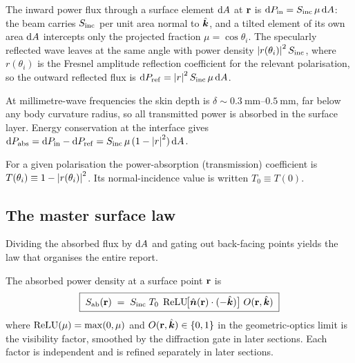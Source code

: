 The inward power flux through a surface element $\mathrm{d} A$ at $\mathbf{r}$ is
$\mathrm{d} P_{\mathrm{in}} = S_{\mathrm{inc}}\,\mu\,\mathrm{d} A$: the beam carries $S_{\mathrm{inc}}$ per unit
area normal to $\hat{\bm{k}}$, and a tilted element of its own area $\mathrm{d} A$
intercepts only the projected fraction $\mu = \cos\theta_i$. The specularly
reflected wave leaves at the same angle with power density
$\abs{r(\theta_i)}^2\,S_{\mathrm{inc}}$, where $r(\theta_i)$ is the Fresnel amplitude
reflection coefficient for the relevant polarisation, so the outward reflected
flux is $\mathrm{d} P_{\mathrm{ref}} = \abs{r}^2\,S_{\mathrm{inc}}\,\mu\,\mathrm{d} A$.

At millimetre-wave frequencies the skin depth is $\delta \sim \SIrange{0.3}{0.5}{\milli\metre}$,
far below any body curvature radius, so all transmitted power is absorbed in
the surface layer. Energy conservation at the interface gives
$\mathrm{d} P_{\mathrm{abs}} = \mathrm{d} P_{\mathrm{in}} - \mathrm{d} P_{\mathrm{ref}}
= S_{\mathrm{inc}}\,\mu\,(1-\abs{r}^2)\,\mathrm{d} A$.

\begin{definition}\label{def:T}
For a given polarisation the power-absorption (transmission) coefficient is
$T(\theta_i) \equiv 1 - \abs{r(\theta_i)}^2$. Its normal-incidence value is
written $T_0 \equiv T(0)$.
\end{definition}

\subsection{The master surface law}\label{sec:master-law}

Dividing the absorbed flux by $\mathrm{d} A$ and gating out back-facing points
yields the law that organises the entire report.

\begin{proposition}\label{prop:master-law}
The absorbed power density at a surface point $\mathbf{r}$ is
\begin{equation}\label{eq:master-law}
  \boxed{\;S_{\mathrm{ab}}(\mathbf{r}) \;=\; S_{\mathrm{inc}}\;T_0\;\operatorname{ReLU}\!\bigl[\hat{\bm{n}}(\mathbf{r})\cdot(-\hat{\bm{k}})\bigr]\;
  O(\mathbf{r},\hat{\bm{k}})\;}
\end{equation}
where $\operatorname{ReLU}(\mu)=\max(0,\mu)$ and $O(\mathbf{r},\hat{\bm{k}})\in\{0,1\}$ in the
geometric-optics limit is the visibility factor, smoothed by the diffraction gate
in later sections. Each factor is independent and is refined separately in later
sections.
\end{proposition}

